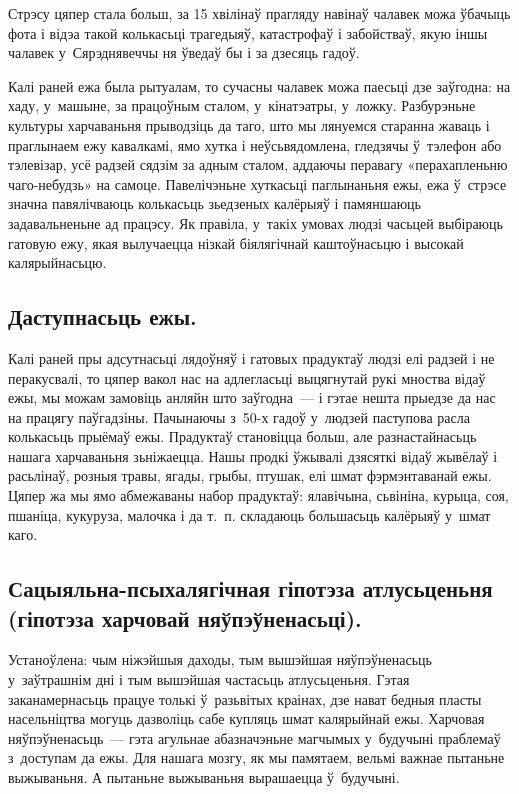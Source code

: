 Стрэсу цяпер стала больш, за 15 хвілінаў прагляду навінаў чалавек можа ўбачыць фота і відэа такой колькасьці трагедыяў, катастрофаў і забойстваў, якую іншы чалавек у~Сярэднявеччы ня ўведаў бы і за дзесяць гадоў.

Калі раней ежа была рытуалам, то сучасны чалавек можа паесьці дзе заўгодна: на хаду, у~машыне, за працоўным сталом, у~кінатэатры, у~ложку. Разбурэньне культуры харчаваньня прыводзіць да таго, што мы лянуемся старанна жаваць і праглынаем ежу кавалкамі, ямо хутка і неўсьвядомлена, гледзячы ў~тэлефон або тэлевізар, усё радзей сядзім за адным сталом, аддаючы перавагу «перахапленьню чаго-небудзь» на самоце. Павелічэньне хуткасьці паглынаньня ежы, ежа ў~стрэсе значна павялічваюць колькасьць зьедзеных калёрыяў і памяншаюць задавальненьне ад працэсу. Як правіла, у~такіх умовах людзі часьцей выбіраюць гатовую ежу, якая вылучаецца нізкай біялягічнай каштоўнасьцю і высокай калярыйнасьцю.

\subsection*{Даступнасьць ежы.}

Калі раней пры адсутнасьці лядоўняў і гатовых прадуктаў людзі елі радзей і не перакусвалі, то цяпер вакол нас на адлегласьці выцягнутай рукі мноства відаў ежы, мы можам замовіць анляйн што заўгодна~--- і гэтае нешта прыедзе да нас на працягу паўгадзіны. Пачынаючы з~50-х гадоў у~людзей паступова расла колькасьць прыёмаў ежы. Прадуктаў становіцца больш, але разнастайнасьць нашага харчаваньня зьніжаецца. Нашы продкі ўжывалі дзясяткі відаў жывёлаў і расьлінаў, розныя травы, ягады, грыбы, птушак, елі шмат фэрмэнтаванай ежы. Цяпер жа мы ямо абмежаваны набор прадуктаў: ялавічына, сьвініна, курыца, соя, пшаніца, кукуруза, малочка і да т.~п. складаюць большасьць калёрыяў у~шмат каго.

\subsection*{Сацыяльна-псыхалягічная гіпотэза атлусьценьня (гіпотэза харчовай няўпэўненасьці).}

Устаноўлена: чым ніжэйшыя даходы, тым вышэйшая няўпэўненасьць у~заўтрашнім дні і тым вышэйшая частасьць атлусьценьня. Гэтая заканамернасьць працуе толькі ў~разьвітых краінах, дзе нават бедныя пласты насельніцтва могуць дазволіць сабе купляць шмат калярыйнай ежы. Харчовая няўпэўненасьць~--- гэта агульнае абазначэньне магчымых у~будучыні праблемаў з~доступам да ежы. Для нашага мозгу, як мы памятаем, вельмі важнае пытаньне выжываньня. А пытаньне выжываньня вырашаецца ў~будучыні.

